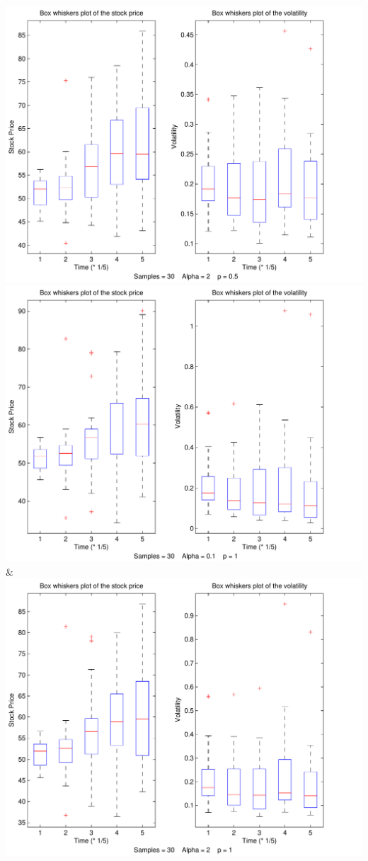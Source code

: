 \documentclass[a4paper,onecolumn,draft]{IEEEtran}
\begin{document}
{			 \includegraphics[width=\stockplotsize]{box_s30_a2_p0-5}\NN\cmidrule(lr){1-2}
		 \includegraphics[width=\stockplotsize]{box_s30_a0-1_p1}&
			 \includegraphics[width=\stockplotsize]{box_s30_a2_p1}\NN\cmidrule(lr){1-2}
}
\end{document}
